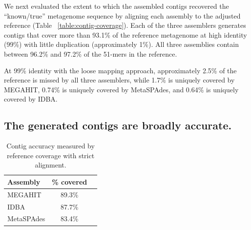\documentclass[11pt]{article}
\begin{document}

We next evaluated the extent to which the assembled contigs recovered the
``known/true'' metagenome sequence by aligning each assembly to the
adjusted reference (Table ~\ref{table:contig-coverage}).  Each of the three
assemblers generates contigs that cover more than 93.1\% of the reference
metagenome at high identity (99\%) with little duplication
(approximately 1\%).  All three assemblies contain between 96.2\% and 97.2\% of
the 51-mers in the reference.

At 99\% identity with the loose mapping approach, approximately 2.5\%
of the reference is missed by all three assemblers, while 1.7\% is
uniquely covered by MEGAHIT, 0.74\% is uniquely covered by MetaSPAdes, and
0.64\% is uniquely covered by IDBA.



\subsection*{The generated contigs are broadly accurate.} 



\begin{table}[!h]
\centering
\caption{Contig accuracy measured by reference coverage with strict alignment.}
\begin{tabular}{|l|c|c|}\hline
\textbf{Assembly} & \textbf {\% covered}
  \\ \hline
MEGAHIT & 89.3\% \\ \hline
IDBA & 87.7\% \\ \hline
MetaSPAdes &  83.4\% \\ \hline
\end{tabular}
\label{table:contig-accuracy}
\end{table}
\end{document}
